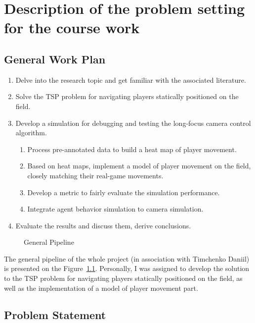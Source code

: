 \chapter{Description of the problem setting for the course work}


\section{General Work Plan}

\begin{enumerate}
    \item Delve into the research topic and get familiar with the associated literature.
    \item Solve the TSP problem for navigating players statically positioned on the field.
    \item Develop a simulation for debugging and testing the long-focus camera control algorithm.
    \begin{enumerate}
        \item Process pre-annotated data to build a heat map of player movement.
        \item Based on heat maps, implement a model of player movement on the field, closely matching their real-game movements.
        \item Develop a metric to fairly evaluate the simulation performance.
        \item Integrate agent behavior simulation to camera simulation.
    \end{enumerate}
    \item Evaluate the results and discuss them, derive conclusions.
\end{enumerate}

\begin{figure}[!ht]
    \centering
    
    \caption{General Pipeline}
    \label{fig:gen-pipe}
\end{figure}

The general pipeline of the whole project (in association with Timchenko Daniil) is presented on the Figure~\ref{fig:gen-pipe}. Personally, I was assigned to develop the solution to the TSP problem for navigating players statically positioned on the field, as well as the implementation of a model of player movement part. 

\section{Problem Statement}
